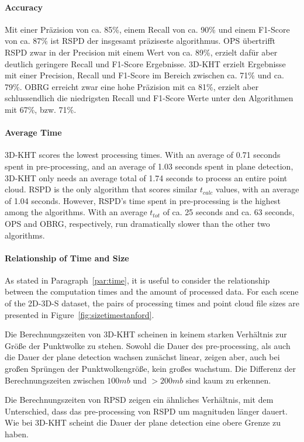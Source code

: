 \documentclass[main.tex]{subfiles}
\begin{document}
\paragraph{Accuracy}
Mit einer Präzision von ca. 85\%, einem Recall von ca. 90\% und einem F1-Score von ca. 87\% ist RSPD der insgesamt präziseste algorithmus.
OPS übertrifft RSPD zwar in der Precision mit einem Wert von ca. 89\%, erzielt dafür aber deutlich geringere Recall und F1-Score Ergebnisse.
3D-KHT erzielt Ergebnisse mit einer Precision, Recall und F1-Score im Bereich zwischen ca. 71\% und ca. 79\%.
OBRG erreicht zwar eine hohe Präzision mit ca 81\%, erzielt aber schlussendlich die niedrigsten Recall und F1-Score Werte unter den Algorithmen mit
67\%, bzw. 71\%.

\paragraph{Average Time }
\label{par:2D-3D-S-time}
3D-KHT scores the lowest processing times. With an average of 0.71 seconds spent in pre-processing, and an average of 1.03 seconds spent in plane detection,
3D-KHT only needs an average total of 1.74 seconds to process an entire point cloud. RSPD is the only algorithm that scores similar $t_{calc}$ values, with an
average of 1.04 seconds. However, RSPD's time spent in pre-processing is the highest among the algorithms.
With an average $t_{tot}$ of ca. 25 seconds and ca. 63 seconds, OPS and OBRG, respectively, run dramatically slower than the other two algorithms.

\paragraph{Relationship of Time and Size}
As stated in Paragraph~\ref{par:time}, it is useful to consider the relationship between the computation times and the amount of
processed data. For each scene of the 2D-3D-S dataset, the pairs of
processing times and point cloud file sizes are presented in Figure~\ref{fig:sizetimestanford}. 

Die Berechnungszeiten von 3D-KHT scheinen in keinem starken Verhältnis zur Größe der Punktwolke zu stehen.
Sowohl die Dauer des pre-processing, als auch die Dauer der plane detection wachsen zunächst linear, 
zeigen aber, auch bei großen Sprüngen der Punktwolkengröße, kein großes wachstum. Die Differenz der 
Berechnungszeiten zwischen $100mb$ und $>200mb$ sind kaum zu erkennen.

Die Berechnungszeiten von RPSD zeigen ein ähnliches Verhältnis, mit dem Unterschied, dass das pre-processing
von RSPD um magnituden länger dauert. Wie bei 3D-KHT scheint die Dauer der plane detection eine obere 
Grenze zu haben.
\end{document}
